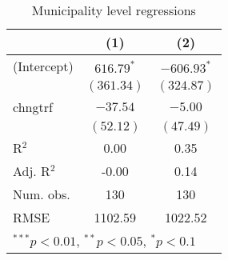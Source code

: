 
\begin{table}
\caption{Municipality level regressions}
\begin{center}
\begin{tabular}{l c c }
\hline
 & (1) & (2) \\
\hline
(Intercept) & $616.79^{*}$ & $-606.93^{*}$ \\
            & $(361.34)$   & $(324.87)$    \\
chngtrf     & $-37.54$     & $-5.00$       \\
            & $(52.12)$    & $(47.49)$     \\
\hline
R$^2$       & 0.00         & 0.35          \\
Adj. R$^2$  & -0.00        & 0.14          \\
Num. obs.   & 130          & 130           \\
RMSE        & 1102.59      & 1022.52       \\
\hline
\multicolumn{3}{l}{\scriptsize{$^{***}p<0.01$, $^{**}p<0.05$, $^*p<0.1$}}
\end{tabular}
\label{table:coefficients}
\end{center}
\end{table}
